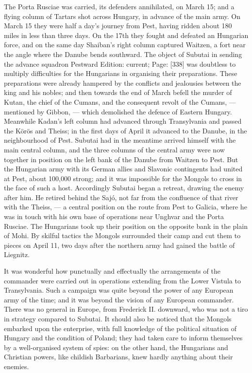The Porta Rusciae was carried, its defenders annihilated, on March 15; and a flying column of Tartars shot across Hungary, in advance of the main army. On March 15 they were half a day\texthebrew{}’s journey from Pest, having ridden about 180 miles in less than three days. On the 17th they fought and defeated an Hungarian force, and on the same day Shaiban\texthebrew{}’s right column captured Waitzen, a fort near the angle where the Danube bends southward. The object of Subutai in sending the advance squadron Pestward Edition: current; Page: [338] was doubtless to multiply difficulties for the Hungarians in organising their preparations. These preparations were already hampered by the conflicts and jealousies between the king and his nobles; and then towards the end of March befell the murder of Kutan, the chief of the Cumans, and the consequent revolt of the Cumans, \texthebrew{—} mentioned by Gibbon, \texthebrew{—} which demolished the defence of Eastern Hungary. Meanwhile Kadan\texthebrew{}’s left column had advanced through Transylvania and passed the Körös and Theiss; in the first days of April it advanced to the Danube, in the neighbourhood of Pest. Subutai had in the meantime arrived himself with the main central column, and the three columns of the central army were now together in position on the left bank of the Danube from Waitzen to Pest. But the Hungarian army with its German allies and Slavonic contingents had united at Pest, about 100,000 strong; and it was impossible for the Mongols to cross in the face of such a host. Accordingly Subutai began a retreat, drawing the enemy after him. He retired behind the Sajó, not far from the confluence of that river with the Theiss, \texthebrew{—} a central position on the route from Pest to Galicia, where he was in touch with his own base of operations near Unghvar and the Porta Rusciae. The Hungarians took up their position on the opposite bank in the plain of Mohi. By skilful tactics the Mongols surrounded their camp and cut them to pieces on April 11, two days after the northern army had gained the battle of Liegnitz.

It was wonderful how punctually and effectually the arrangements of the commander were carried out in operations extending from the Lower Vistula to Transylvania. Such a campaign was quite beyond the power of any European army of the time; and it was beyond the vision of any European commander. There was no general in Europe, from Frederick II. downward, who was not a tiro in strategy compared to Subutai. It should also be noticed that the Mongols embarked upon the enterprise, with full knowledge of the political situation of Hungary and the condition of Poland; they had taken care to inform themselves by a well-organised system of spies: on the other hand, the Hungarians and Christian powers, like childish Barbarians, knew hardly anything about their enemies.

